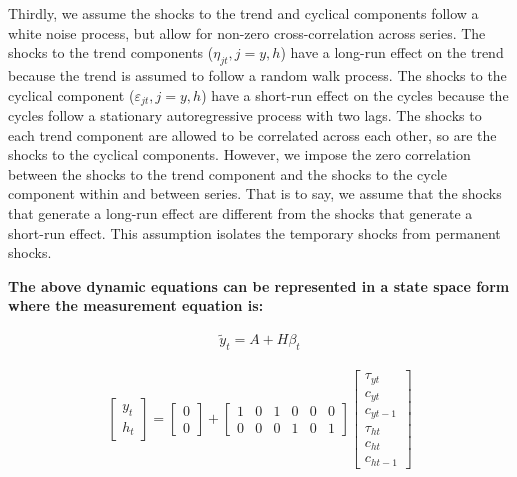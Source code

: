\documentclass[
  12pt,
]{article}
\begin{document}
Thirdly, we assume the shocks to the trend and cyclical components follow a white noise process, but allow for non-zero cross-correlation across series. The shocks to the trend components (\(\eta_{jt}, j=y,h\)) have a long-run effect on the trend because the trend is assumed to follow a random walk process. The shocks to the cyclical component (\(\varepsilon_{jt}, j=y,h\)) have a short-run effect on the cycles because the cycles follow a stationary autoregressive process with two lags. The shocks to each trend component are allowed to be correlated across each other, so are the shocks to the cyclical components. However, we impose the zero correlation between the shocks to the trend component and the shocks to the cycle component within and between series. That is to say, we assume that the shocks that generate a long-run effect are different from the shocks that generate a short-run effect. This assumption isolates the temporary shocks from permanent shocks.

        
        \textbf{The above dynamic equations can be represented in a state space form where the measurement equation is: }

        \begin{align}
        \tilde{y}_t = A + H\beta_t
        \end{align}
        
        \begin{align*}
        \begin{bmatrix}
        y_t \\
        h_t
        \end{bmatrix}
        =
        \begin{bmatrix}
        0   \\
        0
        \end{bmatrix}
        +
        \begin{bmatrix}
        1   & 0 & 1 & 0 & 0 & 0 \\
        0   & 0 & 0 & 1 & 0 & 1
        \end{bmatrix}
        \begin{bmatrix}
        \tau_{yt}   \\
        c_{yt}      \\
        c_{yt-1}    \\
        \tau_{ht}   \\
        c_{ht}      \\
        c_{ht-1}
        \end{bmatrix}
        \end{align*}
        
\end{document}
